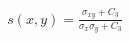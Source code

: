 \documentclass[preview]{standalone}
\begin{document}
\begin{align*}
s(x,y) = \frac{\sigma_{xy} + C_3}{\sigma_x\sigma_y + C_3}
\end{align*}
\end{document}
